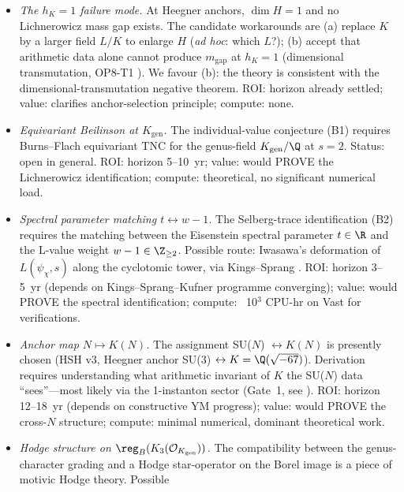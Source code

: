 \begin{itemize}
\item[\textbf{(O1)}] {\em The $h_K = 1$ failure mode.}
   At Heegner anchors, $\dim H = 1$ and no Lichnerowicz mass gap
   exists.  The candidate workarounds are (a) replace $K$ by a
   larger field $L/K$ to enlarge $H$ ({\em ad hoc}: which $L$?);
   (b) accept that arithmetic data alone cannot produce $m_{\mathrm{gap}}$
   at $h_K = 1$ (dimensional transmutation, OP8-T1
   \cite{NoArithmeticMgap2026}).  We favour (b): the
   theory is consistent with the dimensional-transmutation negative
   theorem.  ROI: horizon already settled; value: clarifies
   anchor-selection principle; compute: none.
\item[\textbf{(O2)}] {\em Equivariant Beilinson at $K_{\mathrm{gen}}$.}
   The individual-value conjecture (B1) requires Burns--Flach
   \cite{BurnsFlach2001} equivariant TNC for the genus-field
   $K_{\mathrm{gen}}/\Q$ at $s = 2$.  Status: open in general.  ROI:
   horizon 5--10~yr; value: would PROVE the Lichnerowicz
   identification; compute: theoretical, no significant numerical
   load.
\item[\textbf{(O3)}] {\em Spectral parameter matching $t \leftrightarrow
   w-1$.}  The Selberg-trace identification (B2) requires the
   matching between the Eisenstein spectral parameter $t \in \R$ and
   the L-value weight $w - 1 \in \Z_{\ge 2}$.  Possible route:
   Iwasawa's deformation of $L(\psi_\chi, s)$ along the cyclotomic
   tower, via Kings--Sprang \cite{KingsSprang2024}.  ROI: horizon
   3--5~yr (depends on Kings--Sprang--Kufner programme converging);
   value: would PROVE the spectral identification; compute: ~10$^3$
   CPU-hr on Vast for verifications.
\item[\textbf{(O4)}] {\em Anchor map $N \mapsto K(N)$.}  The
   assignment SU($N$) $\leftrightarrow K(N)$ is presently chosen
   (HSH v3, Heegner anchor SU(3) $\leftrightarrow K = \Q(\sqrt{-67})$).
   Derivation requires understanding what arithmetic invariant of $K$
   the SU($N$) data ``sees''---most likely via the 1-instanton sector
   (Gate~1, see \cite[\S4]{Marathon2026_FINAL}).
   ROI: horizon 12--18~yr (depends on constructive YM progress);
   value: would PROVE the cross-$N$ structure; compute: minimal
   numerical, dominant theoretical work.
\item[\textbf{(O5)}] {\em Hodge structure on
   $\reg_B(K_3(\mathcal{O}_{K_{\mathrm{gen}}}))$.}  The compatibility
   between the genus-character grading and a Hodge star-operator on
   the Borel image is a piece of motivic Hodge theory.  Possible

\end{itemize}

